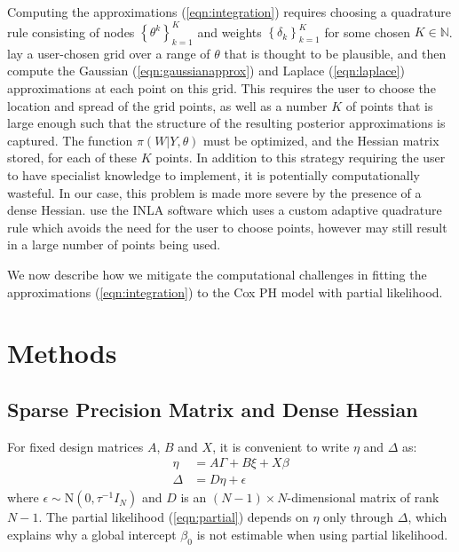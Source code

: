 \documentclass[ba]{imsart}
\begin{document}
Computing the approximations (\ref{eqn:integration}) requires choosing a quadrature rule consisting of nodes $\left\{\theta^{k}\right\}_{k=1}^{K}$ and weights $\left\{\delta_{k}\right\}_{k=1}^{K}$ for some chosen $K\in\mathbb{N}$. \cite{casecross} lay a user-chosen grid over a range of $\theta$ that is thought to be plausible, and then compute the Gaussian (\ref{eqn:gaussianapprox}) and Laplace (\ref{eqn:laplace}) approximations at each point on this grid. This requires the user to choose the location and spread of the grid points, as well as a number $K$
of points that is large enough such that the structure of the resulting posterior approximations is captured. The function $\pi(W|Y,\theta)$ must be optimized, and the Hessian matrix stored, for each of these $K$ points. In addition to this strategy requiring the user to have specialist knowledge to implement, it is potentially computationally wasteful. In our case, this problem is made more severe by the presence of a dense Hessian. \cite{inlacoxph} use the INLA software which uses a custom adaptive quadrature rule which avoids the need for the user to choose points, however may still result in a large number of points being used.

We now describe how we mitigate the computational challenges in fitting the approximations (\ref{eqn:integration}) to the Cox PH model with partial likelihood.

\section{Methods}\label{sec:method}

\subsection{Sparse Precision Matrix and Dense Hessian}

For fixed design matrices $A$, $B$ and $X$, it is convenient to write $\eta$ and $\Delta$ as:
\begin{equation}\begin{aligned}
\eta &= A\Gamma + B\xi + X\beta \\
\Delta &= D\eta + \epsilon
\end{aligned}\end{equation}
where $\epsilon \sim \text{N}\left( 0,\tau^{-1}I_{N}\right)$ and $D$ is an $(N -1) \times N $-dimensional matrix of rank $N -1$. The partial likelihood (\ref{eqn:partial}) depends on $\eta$ only through $\Delta$, which explains why a global intercept $\beta_{0}$ is not estimable when using partial likelihood. 
\end{document}
